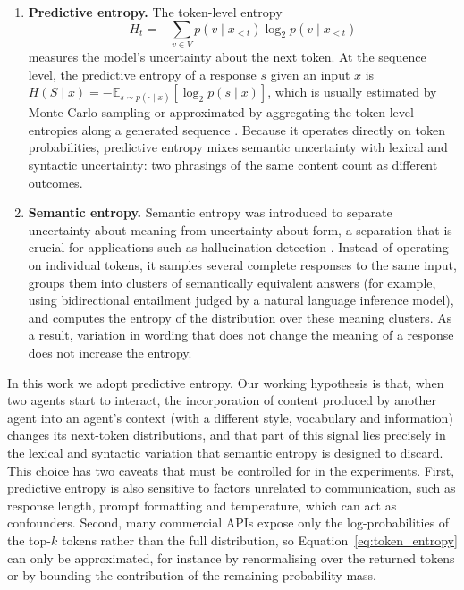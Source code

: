 \begin{enumerate}
  \item \textbf{Predictive entropy.} The token-level entropy
  \begin{equation}
    H_t = - \sum_{v \in V} p(v \mid x_{<t}) \log_2 p(v \mid x_{<t})
    \label{eq:token_entropy}
  \end{equation}
  measures the model's uncertainty about the next token. At the sequence level, the predictive entropy of a response $s$ given an input $x$ is $H(S \mid x) = -\mathbb{E}_{s \sim p(\cdot \mid x)}\left[\log_2 p(s \mid x)\right]$, which is usually estimated by Monte Carlo sampling or approximated by aggregating the token-level entropies along a generated sequence \parencite{malinin2021uncertainty}. Because it operates directly on token probabilities, predictive entropy mixes semantic uncertainty with lexical and syntactic uncertainty: two phrasings of the same content count as different outcomes.
  \item \textbf{Semantic entropy.} Semantic entropy was introduced to separate uncertainty about meaning from uncertainty about form, a separation that is crucial for applications such as hallucination detection \parencite{kuhn2023semantic, shannon_hallucination}. Instead of operating on individual tokens, it samples several complete responses to the same input, groups them into clusters of semantically equivalent answers (for example, using bidirectional entailment judged by a natural language inference model), and computes the entropy of the distribution over these meaning clusters. As a result, variation in wording that does not change the meaning of a response does not increase the entropy.
\end{enumerate}

In this work we adopt predictive entropy. Our working hypothesis is that, when two agents start to interact, the incorporation of content produced by another agent into an agent's context (with a different style, vocabulary and information) changes its next-token distributions, and that part of this signal lies precisely in the lexical and syntactic variation that semantic entropy is designed to discard. This choice has two caveats that must be controlled for in the experiments. First, predictive entropy is also sensitive to factors unrelated to communication, such as response length, prompt formatting and temperature, which can act as confounders. Second, many commercial APIs expose only the log-probabilities of the top-$k$ tokens rather than the full distribution, so Equation~\eqref{eq:token_entropy} can only be approximated, for instance by renormalising over the returned tokens or by bounding the contribution of the remaining probability mass.

